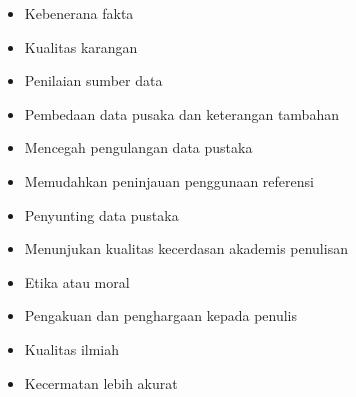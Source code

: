 \begin{itemize}
\vspace{\baselineskip}
	\item Kebenerana fakta\par

\vspace{\baselineskip}
	\item Kualitas karangan\par

\vspace{\baselineskip}
	\item Penilaian sumber data\par

\vspace{\baselineskip}
	\item Pembedaan data pusaka dan keterangan tambahan\par

\vspace{\baselineskip}
	\item Mencegah pengulangan data pustaka\par

\vspace{\baselineskip}
	\item Memudahkan peninjauan penggunaan referensi\par

\vspace{\baselineskip}
	\item Penyunting data pustaka\par

\vspace{\baselineskip}
	\item Menunjukan kualitas kecerdasan akademis penulisan\par

\vspace{\baselineskip}
	\item Etika atau moral\par

\vspace{\baselineskip}
	\item Pengakuan dan penghargaan kepada penulis\par

\vspace{\baselineskip}
	\item Kualitas ilmiah\par

\vspace{\baselineskip}
	\item Kecermatan lebih akurat\par


\end{itemize}
